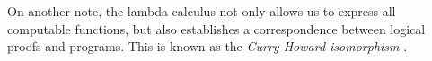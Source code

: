 On another note, the lambda calculus not only allows us to express all computable functions, but also establishes a correspondence between logical proofs and programs. This is known as the \emph{Curry-Howard isomorphism} \cite{girardProofsTypes1989}.






